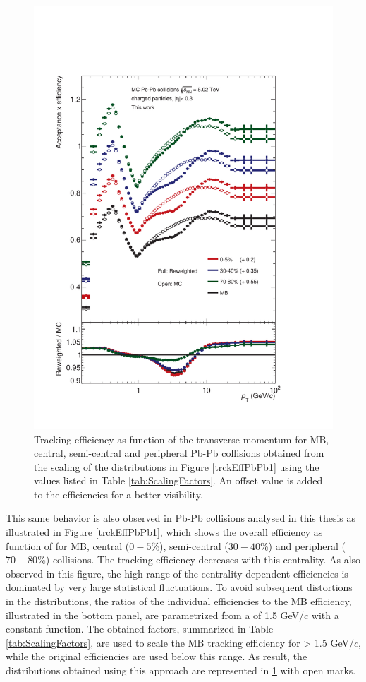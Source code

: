 \documentclass[12pt,a4paper]{report}
\begin{document}
\begin{figure}[tb!]
\centering
\includegraphics[width=12cm]{Plots/trckEffPbPb2.pdf}  
\caption{Tracking efficiency as function of the transverse momentum for MB, central, semi-central and peripheral Pb-Pb collisions obtained from the scaling of the distributions in Figure \ref{trckEffPbPb1} using the values listed in Table \ref{tab:ScalingFactors}.  An offset value is added to the efficiencies for a better visibility.}
\label{trckEffPbPb2}
\end{figure}
\hspace{-0.3cm} This same behavior is also observed in Pb-Pb collisions analysed in this thesis as illustrated in Figure \ref{trckEffPbPb1}, which shows the overall efficiency as function of \pt for MB, central ($0-5$\%), semi-central ($30-40$\%) and peripheral ($70-80$\%) collisions. The tracking efficiency decreases with this centrality. As also observed in this figure, the high \pt range of the centrality-dependent efficiencies is dominated by very large statistical fluctuations. To avoid subsequent distortions in the \pt distributions, the ratios of the individual efficiencies to the MB efficiency, illustrated in the bottom panel, are parametrized from a \pt of 1.5 GeV/$c$ with a constant function. The obtained factors, summarized in Table \ref{tab:ScalingFactors}, are used to scale the MB tracking efficiency for \pt > 1.5 GeV/$c$, while the original efficiencies are used below this range. As result,  the distributions obtained using this approach are represented in \ref{trckEffPbPb2} with open marks. 
\end{document}
